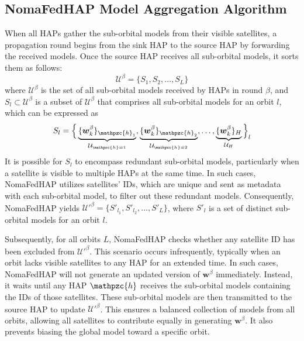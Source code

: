 \documentclass[letter,journal]{IEEEtran}
\begin{document}
\subsection{NomaFedHAP Model Aggregation Algorithm}\label{sec:aggreg} 
When all HAPs gather the sub-orbital models from their visible satellites, a propagation round begins from the sink HAP to the source HAP by forwarding the received models. Once the source HAP receives all sub-orbital models, it sorts them as follows:
\begin{equation} \label{Eqn34}
    \mathcal{U}^{\beta}= \{ S_{1}, S_{2},\dots,S_\textit{L}\}
\end{equation}
where $\mathcal{U}^{\beta}$ is the set of all sub-orbital models received by HAPs in round $\beta$, and 
 $S_{l}\subset\mathcal{U}^{\beta}$ is a subset of $\mathcal{U}^{\beta}$ that comprises all sub-orbital models for an orbit $l$, which can be expressed as
\begin{equation} \label{Eqn35}
    S_{l}= \Big\{ \underbrace{\{{\boldsymbol{w}_{k}^{\beta}}\}_{\mathpzc{h}_1}}_{\mathcal{U}_{\mathpzc{h}=1}},\underbrace{\{{\boldsymbol{w}_{k}^{\beta}}\}_{\mathpzc{h}_2}}_{\mathcal{U}_{\mathpzc{h}=2}},\dots,\underbrace{\{{\boldsymbol{w}_{k}^{\beta}}\}_{H}}_{\mathcal{U}_{H}}\Big\}_l
\end{equation}
It is possible for $S_{l}$ to encompass redundant sub-orbital models, particularly when a satellite is visible to multiple HAPs at the same time. In such cases, NomaFedHAP utilizes satellites' IDs, which are unique and sent as metadata with each sub-orbital model, to filter out these redundant models. Consequently, NomaFedHAP yields $\mathcal{U}'^{\beta} = \{S'_{l_1},S'_{l_2},\dots,S'_{L} \}$, where $S'_l$ is a set of distinct sub-orbital models for an orbit $l$.



Subsequently, for all orbits $L$, NomaFedHAP checks whether any satellite ID has been excluded from $\mathcal{U}'^{\beta}$. This scenario occurs infrequently, typically when an orbit lacks visible satellites to any HAP for an extended time. In such cases, NomaFedHAP will not generate an updated version of $\boldsymbol{w}^\beta$ immediately. Instead, it waits until any HAP $\mathpzc{h}$ receives the sub-orbital models containing the IDs of those satellites. These sub-orbital models are then transmitted to the source HAP to update $\mathcal{U}'^{\beta}$. This ensures a balanced collection of models from all orbits, allowing all satellites to contribute equally in generating $\boldsymbol{w}^\beta$. It also prevents biasing the global model toward a specific orbit.
\end{document}
